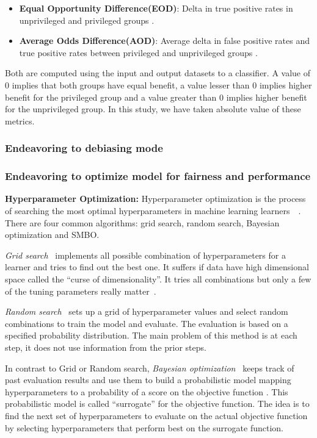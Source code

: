 \documentclass{NSF}
\newenvironment{myitemize}
{ \begin{itemize}
    \setlength{\itemsep}{0pt}
    \setlength{\parskip}{0pt}
    \setlength{\parsep}{0pt}     }
{ \end{itemize}                  }
\newcommand{\bi}{\begin{myitemize}}
\newcommand{\ei}{\end{myitemize}}
\begin{document}
\begin{nsfdescription}
\bi
\item \textbf{Equal Opportunity Difference(EOD)}:  Delta in true positive rates in unprivileged and privileged groups \cite{IBM}. 
\item \textbf{Average Odds Difference(AOD)}: Average delta in false positive rates and true positive rates between privileged and unprivileged groups \cite{IBM}.
\ei
Both are computed using the input and output datasets to a classifier. A value of 0 implies that both groups have equal benefit, a value lesser than 0 implies higher benefit for the privileged group and a value greater than 0 implies higher benefit for the unprivileged group. In this study, we have taken absolute value of these metrics. 

\subsubsection{Endeavoring to debiasing mode}\label{tion:debiasing}

\subsubsection{Endeavoring to optimize model for fairness and performance}\label{tion:hyper}
\textbf{Hyperparameter Optimization:}
Hyperparameter optimization is the process of searching the most optimal hyperparameters in machine learning learners~\cite{biedenkapp2018hyperparameter}~\cite{franceschi2017forward}. There are four common algorithms: grid search, random search, Bayesian optimization and SMBO.

\textit{Grid search}~\cite{bergstra2011algorithms} implements all possible combination of hyperparameters for a learner and tries to find out the best one. It suffers if data have high dimensional space called the ``curse of dimensionality''. It tries all combinations but only a few of the tuning parameters really matter~\cite{bergstra2012random}.

\textit{Random search}~\cite{bergstra2012random} sets up a grid of hyperparameter values and select random combinations to train the model and evaluate. The evaluation is based on a specified probability distribution. The main problem of this method is at each step, it does not use information from the prior steps. 

In contrast to Grid or Random search, \textit{Bayesian optimization}~\cite{pelikan1999boa} keeps track of past evaluation results and use them to build a probabilistic model mapping hyperparameters to a probability of a score on the objective function \cite{Will_Koehrsen}. This probabilistic model is called ``surrogate'' for the objective function. The idea is to find the next set of hyperparameters to evaluate on the actual objective function by selecting hyperparameters that perform best on the surrogate function.


\end{nsfdescription}
\end{document}
